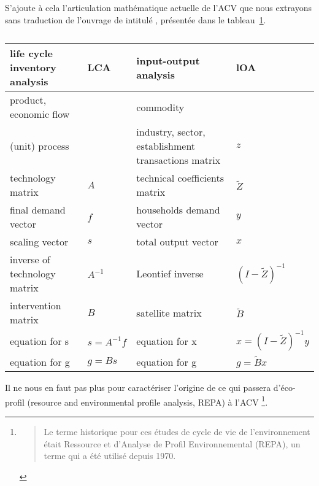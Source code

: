 S'ajoute à cela l'articulation mathématique actuelle de l'ACV que nous extrayons sans traduction de l'ouvrage de \citeauthor{heijungs_computational_2002} intitulé , présentée dans le tableau~\ref{tab:heijungs_computational_2002}.
\begin{table}[htbp]
\centering
\begin{tabular}{p{3.5cm} | p{2cm} | p{3.3cm} | p{3cm}}
life cycle inventory analysis & LCA & input-output analysis & lOA \\
\hline
product, economic flow & & commodity &  \\
(unit) process & & industry, sector, establishment transactions matrix & $z$ \\
technology matrix & $A$ & technical coefficients matrix & $\tilde{Z}$ \\
final demand vector & $f$ & households demand vector & $y$ \\
scaling vector & $s$ & total output vector & $x$ \\
inverse of technology matrix & $A^{-1}$ & Leontief inverse & $(I-\tilde{Z})^{-1}$ \\
intervention matrix & $B$ & satellite matrix & $\tilde{B}$ \\
equation for s & $s = A^{-1} f$ & equation for x & $x = (I - \tilde{Z})^{-1} y$ \\
equation for g & $g=Bs$ & equation for g & $g=\tilde{B}x$ \\
\end{tabular}
\caption{\cite[Table 5.1: Overview of analogous concepts in life cycle inventory analysis and input-output analysis.]{heijungs_computational_2002}}
\label{tab:heijungs_computational_2002}
\end{table}

Il ne nous en faut pas plus pour caractériser l'origine de ce qui passera d'éco-profil (resource and environmental profile analysis, REPA) à l'ACV
\footnote{
\blockcquote[traduction]{hunt_lca-_1996}{
Le terme historique pour ces études de cycle de vie de l'environnement était Ressource et d'Analyse de Profil Environnemental (REPA), un terme qui a été utilisé depuis 1970.
}
}.

